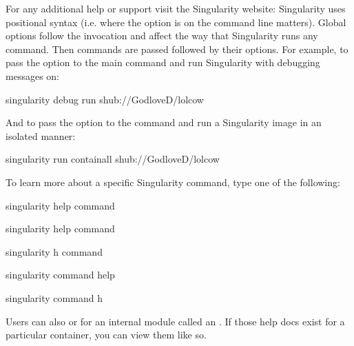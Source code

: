 \documentclass[letterpaper,10pt,english]{sphinxmanual}
\begin{document}
For any additional help or support visit the Singularity website:
Singularity uses positional syntax (i.e. where the option is on the command line matters). Global options follow the 
invocation and affect the way that Singularity runs any command. Then
commands are passed followed by their options.
For example, to pass the  option to the main  command and run
Singularity with debugging messages on:

%
\begin{sphinxVerbatim}[commandchars=\\\{\}]
\PYGZdl{} singularity \PYGZhy{}\PYGZhy{}debug run shub://GodloveD/lolcow
\end{sphinxVerbatim}

And to pass the  option to the  command and run a Singularity image in an
isolated manner:

%
\begin{sphinxVerbatim}[commandchars=\\\{\}]
\PYGZdl{} singularity run \PYGZhy{}\PYGZhy{}containall shub://GodloveD/lolcow
\end{sphinxVerbatim}

To learn more about a specific Singularity command, type one of the
following:

%
\begin{sphinxVerbatim}[commandchars=\\\{\}]
\PYGZdl{} singularity help \PYGZlt{}command\PYGZgt{}

\PYGZdl{} singularity \PYGZhy{}\PYGZhy{}help \PYGZlt{}command\PYGZgt{}

\PYGZdl{} singularity \PYGZhy{}h \PYGZlt{}command\PYGZgt{}

\PYGZdl{} singularity \PYGZlt{}command\PYGZgt{} \PYGZhy{}\PYGZhy{}help

\PYGZdl{} singularity \PYGZlt{}command\PYGZgt{} \PYGZhy{}h
\end{sphinxVerbatim}

Users can also {\hyperref[\detokenize{container_recipes:help}]{}} or for an internal module called an . If those help
docs exist for a particular container, you can view them like so.
\end{document}
